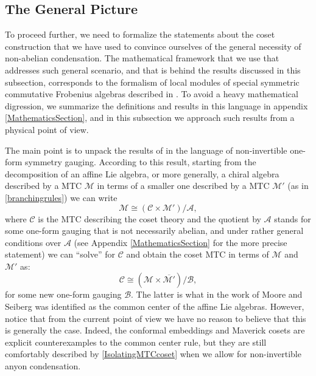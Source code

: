 \documentclass[11pt]{article}
\numberwithin{equation}{section}
\begin{document}
\subsection{The General Picture} \label{GeneralNonAbelianAnyonCondesationPicture}

To proceed further, we need to formalize the statements about the coset construction that we have used to convince ourselves of the general necessity of non-abelian condensation. The mathematical framework that we use that addresses such general scenario, and that is behind the results discussed in this subsection, corresponds to the formalism of local modules of special symmetric commutative Frobenius algebras described in \cite{Frohlich:2003hm}. To avoid a heavy mathematical digression, we summarize the definitions and results in this language in appendix \ref{MathematicsSection}, and in this subsection we approach such results from a physical point of view.

The main point is to unpack the results of \cite{Frohlich:2003hm} in the language of non-invertible one-form symmetry gauging. According to this result, starting from the decomposition of an affine Lie algebra, or more generally, a chiral algebra described by a MTC $\mathcal{M}$ in terms of a smaller one described by a MTC $\mathcal{M}'$ (as in \eqref{branchingrules}) we can write
\begin{equation} \label{MTCEmbedding}
    \mathcal{M} \cong (\mathcal{C} \times  \mathcal{M}')/\mathcal{A},
\end{equation}
where $\mathcal{C}$ is the MTC describing the coset theory and the quotient by $\mathcal{A}$ stands for some one-form gauging that is not necessarily abelian, and under rather general conditions over $\mathcal{A}$ (see Appendix \ref{MathematicsSection} for the more precise statement) we can ``solve'' for $\mathcal{C}$ and obtain the coset MTC in terms of $\mathcal{M}$ and $\mathcal{M}'$ as:
\begin{equation} \label{IsolatingMTCcoset}
    \mathcal{C} \cong (\mathcal{M} \times \overline{\mathcal{M}'})/\mathcal{B},
\end{equation}
for some new one-form gauging $\mathcal{B}$. The latter is what in the work of Moore and Seiberg \cite{Moore:1989yh} was identified as the common center of the affine Lie algebras. However, notice that from the current point of view we have no reason to believe that this is generally the case. Indeed, the conformal embeddings and Maverick cosets are explicit counterexamples to the common center rule, but they are still comfortably described by \eqref{IsolatingMTCcoset} when we allow for non-invertible anyon condensation.
\end{document}
